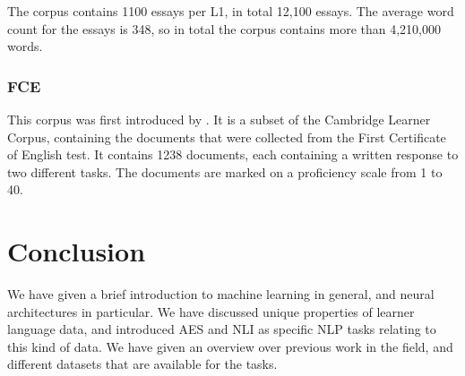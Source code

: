 The corpus contains 1100 essays per L1, in total 12,100 essays. The average
word count for the essays is 348, so in total the corpus contains more than
4,210,000 words.


\subsubsection{FCE}

This corpus was first introduced by \textcite{yannakoudakis2011new}. It is a
subset of the Cambridge Learner Corpus, containing the documents that were
collected from the First Certificate of English test. It contains 1238
documents, each containing a written response to two different tasks. The
documents are marked on a proficiency scale from 1 to 40.


\section{Conclusion}

We have given a brief introduction to machine learning in general, and neural
architectures in particular. We have discussed unique properties of learner
language data, and introduced \ac{AES} and \ac{NLI} as specific \ac{NLP}
tasks relating to this kind of data. We have given an overview over previous
work in the field, and different datasets that are available for the tasks.
